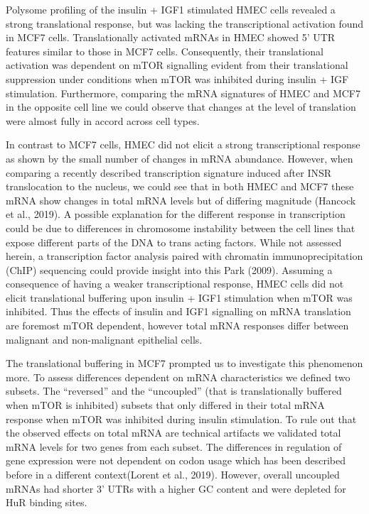 \documentclass[
  12pt,
  openany]{book}
\begin{document}
Polysome profiling of the insulin + IGF1 stimulated HMEC cells revealed a strong translational response, but was lacking the transcriptional activation found in MCF7 cells. Translationally activated mRNAs in HMEC showed 5' UTR features similar to those in MCF7 cells. Consequently, their translational activation was dependent on mTOR signalling evident from their translational suppression under conditions when mTOR was inhibited during insulin + IGF stimulation. Furthermore, comparing the mRNA signatures of HMEC and MCF7 in the opposite cell line we could observe that changes at the level of translation were almost fully in accord across cell types.

In contrast to MCF7 cells, HMEC did not elicit a strong transcriptional response as shown by the small number of changes in mRNA abundance. However, when comparing a recently described transcription signature induced after INSR translocation to the nucleus, we could see that in both HMEC and MCF7 these mRNA show changes in total mRNA levels but of differing magnitude (Hancock et al., 2019). A possible explanation for the different response in transcription could be due to differences in chromosome instability between the cell lines that expose different parts of the DNA to trans acting factors. While not assessed herein, a transcription factor analysis paired with chromatin immunoprecipitation (ChIP) sequencing could provide insight into this Park (2009). Assuming a consequence of having a weaker transcriptional response, HMEC cells did not elicit translational buffering upon insulin + IGF1 stimulation when mTOR was inhibited. Thus the effects of insulin and IGF1 signalling on mRNA translation are foremost mTOR dependent, however total mRNA responses differ between malignant and non-malignant epithelial cells.

The translational buffering in MCF7 prompted us to investigate this phenomenon more. To assess differences dependent on mRNA characteristics we defined two subsets. The ``reversed'' and the ``uncoupled'' (that is translationally buffered when mTOR is inhibited) subsets that only differed in their total mRNA response when mTOR was inhibited during insulin stimulation. To rule out that the observed effects on total mRNA are technical artifacts we validated total mRNA levels for two genes from each subset. The differences in regulation of gene expression were not dependent on codon usage which has been described before in a different context(Lorent et al., 2019). However, overall uncoupled mRNAs had shorter 3' UTRs with a higher GC content and were depleted for HuR binding sites.
\end{document}
